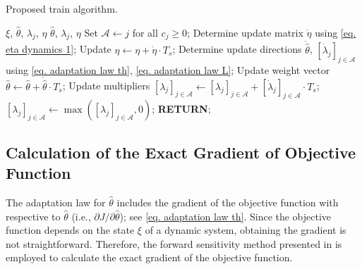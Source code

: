 \documentclass[lettersize,journal]{IEEEtran}
\begin{document}
\begin{algorithm}[H]
    \caption{Proposed train algorithm.}\label{alg: alg1}
    \begin{algorithmic}[1]
        \renewcommand{\algorithmicrequire}{\textbf{Input:}}
        \renewcommand{\algorithmicensure}{\textbf{Output:}}
        \REQUIRE $\xi$, $\hat\theta$, $\lambda_j$, $\eta$
        \ENSURE  $\hat\theta$, $\lambda_j$, $\eta$
        \STATE Set $\mathcal A \leftarrow j$ for all $c_j\ge0$;
        \STATE Determine update matrix $\dot\eta$ using \eqref{eq. eta dynamics 1};
        \STATE Update $\eta\leftarrow \eta +\dot\eta\cdot T_s$; 
        \STATE Determine update directions $\dot{\hat\theta}$, $[\dot\lambda_j]_{j\in\mathcal A}$ using \eqref{eq. adaptation law th}, \eqref{eq. adaptation law L};
        \STATE Update weight vector $\hat\theta\leftarrow \hat\theta+\dot{\hat\theta}\cdot T_s$;
        \STATE Update multipliers $[\lambda_j]_{j\in\mathcal A}\leftarrow [\lambda_j]_{j\in\mathcal A}+[\dot\lambda_j]_{j\in\mathcal A}\cdot T_s$;
        \STATE $[\lambda_j]_{j\in\mathcal A}\leftarrow \max([\lambda_j]_{j\in\mathcal A}, 0)$;
        \STATE \textbf{RETURN};
    \end{algorithmic}
    \label{alg1}
\end{algorithm}

\subsection{Calculation of the Exact Gradient of Objective Function}

The adaptation law for $\hat\theta$ includes the gradient of the objective function with respective to $\hat\theta$ (i.e., ${\partial J/\partial \hat\theta}$); see \eqref{eq. adaptation law th}. Since the objective function depends on the state $\xi$ of a dynamic system, obtaining the gradient is not straightforward. Therefore, the forward sensitivity method presented in \cite{RN12} is employed to calculate the exact gradient of the objective function. 
\end{document}
